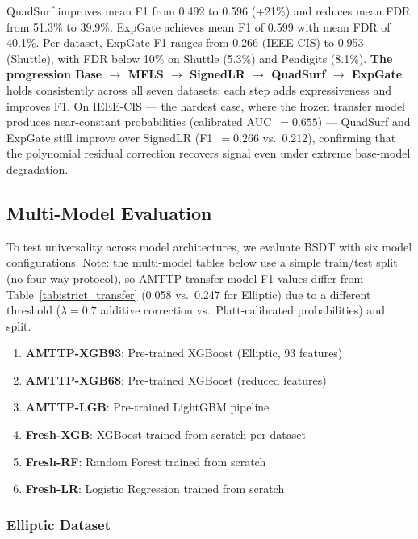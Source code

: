 \documentclass[journal]{IEEEtran}
\begin{document}
QuadSurf improves mean F1 from 0.492 to 0.596 (+21\%) and reduces mean FDR from 51.3\% to 39.9\%. ExpGate achieves mean F1 of 0.599 with mean FDR of 40.1\%. Per-dataset, ExpGate F1 ranges from 0.266 (IEEE-CIS) to 0.953 (Shuttle), with FDR below 10\% on Shuttle (5.3\%) and Pendigits (8.1\%). \textbf{The progression Base $\to$ MFLS $\to$ SignedLR $\to$ QuadSurf $\to$ ExpGate} holds consistently across all seven datasets: each step adds expressiveness and improves F1. On IEEE-CIS --- the hardest case, where the frozen transfer model produces near-constant probabilities (calibrated AUC~$= 0.655$) --- QuadSurf and ExpGate still improve over SignedLR (F1~$= 0.266$ vs.~0.212), confirming that the polynomial residual correction recovers signal even under extreme base-model degradation.

\subsection{Multi-Model Evaluation}
\label{ssec:multimodel}

To test universality across model architectures, we evaluate BSDT with six model configurations. Note: the multi-model tables below use a simple train/test split (no four-way protocol), so AMTTP transfer-model F1 values differ from Table~\ref{tab:strict_transfer} (0.058 vs.\ 0.247 for Elliptic) due to a different threshold ($\lambda = 0.7$ additive correction vs.\ Platt-calibrated probabilities) and split.

\begin{enumerate}
  \item \textbf{AMTTP-XGB93}: Pre-trained XGBoost (Elliptic, 93 features)
  \item \textbf{AMTTP-XGB68}: Pre-trained XGBoost (reduced features)
  \item \textbf{AMTTP-LGB}: Pre-trained LightGBM pipeline
  \item \textbf{Fresh-XGB}: XGBoost trained from scratch per dataset
  \item \textbf{Fresh-RF}: Random Forest trained from scratch
  \item \textbf{Fresh-LR}: Logistic Regression trained from scratch
\end{enumerate}

\subsubsection{Elliptic Dataset}
\end{document}
